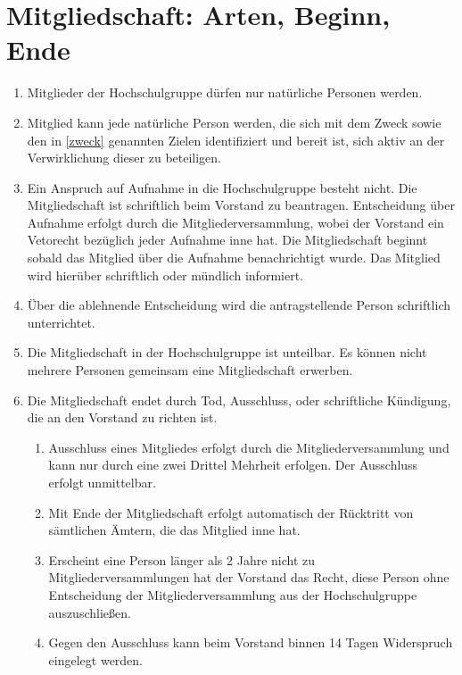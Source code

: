 \documentclass[11pt]{article}
\begin{document}
	\section{Mitgliedschaft: Arten, Beginn, Ende}
	\begin{enumerate}
		\item Mitglieder der Hochschulgruppe dürfen nur natürliche Personen werden.
        \item Mitglied kann jede natürliche Person werden, die sich mit dem Zweck sowie den in \ref{zweck} genannten Zielen identifiziert und bereit ist, sich aktiv an der Verwirklichung dieser zu beteiligen.
		\item Ein Anspruch auf Aufnahme in die Hochschulgruppe besteht nicht. Die Mitgliedschaft ist
		schriftlich beim Vorstand zu beantragen. Entscheidung über Aufnahme erfolgt durch die Mitgliederversammlung, wobei der Vorstand ein Vetorecht bezüglich jeder Aufnahme inne hat. Die Mitgliedschaft beginnt sobald das Mitglied über die Aufnahme benachrichtigt wurde. Das Mitglied wird hierüber schriftlich oder mündlich informiert.
		\item Über die ablehnende Entscheidung wird die antragstellende Person schriftlich unterrichtet.
		\item Die Mitgliedschaft in der Hochschulgruppe ist unteilbar. Es können nicht mehrere Personen
		gemeinsam eine Mitgliedschaft erwerben.
		\item Die Mitgliedschaft endet durch Tod, Ausschluss, oder schriftliche Kündigung, die an den Vorstand zu richten ist.
		\begin{enumerate}
			\item Ausschluss eines Mitgliedes erfolgt durch die Mitgliederversammlung und kann nur durch eine zwei Drittel Mehrheit erfolgen. Der Ausschluss erfolgt unmittelbar.
			\item Mit Ende der Mitgliedschaft erfolgt automatisch der Rücktritt von sämtlichen Ämtern, die das Mitglied inne hat.
            \item Erscheint eine Person länger als 2 Jahre nicht zu Mitgliederversammlungen hat der Vorstand das Recht, diese Person ohne Entscheidung der Mitgliederversammlung aus der Hochschulgruppe auszuschließen.
            \item Gegen den Ausschluss kann beim Vorstand binnen 14 Tagen Widerspruch eingelegt werden.
		\end{enumerate}
	\end{enumerate}
\end{document}
